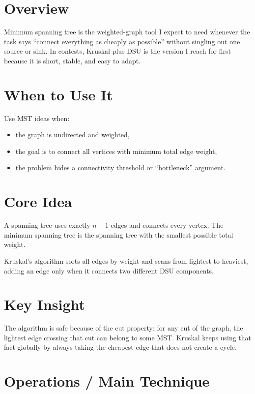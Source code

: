 \section*{Overview}

Minimum spanning tree is the weighted-graph tool I expect to need whenever the task says ``connect everything as
cheaply as possible'' without singling out one source or sink. In contests, Kruskal plus DSU is the version I reach for
first because it is short, stable, and easy to adapt.

\section*{When to Use It}

Use MST ideas when:

\begin{itemize}
  \item the graph is undirected and weighted,
  \item the goal is to connect all vertices with minimum total edge weight,
  \item the problem hides a connectivity threshold or ``bottleneck'' argument.
\end{itemize}

\section*{Core Idea}

A spanning tree uses exactly \(n - 1\) edges and connects every vertex. The minimum spanning tree is the spanning tree
with the smallest possible total weight.

Kruskal's algorithm sorts all edges by weight and scans from lightest to heaviest, adding an edge only when it connects
two different DSU components.

\section*{Key Insight}

The algorithm is safe because of the cut property: for any cut of the graph, the lightest edge crossing that cut can
belong to some MST. Kruskal keeps using that fact globally by always taking the cheapest edge that does not create a
cycle.

\section*{Operations / Main Technique}


